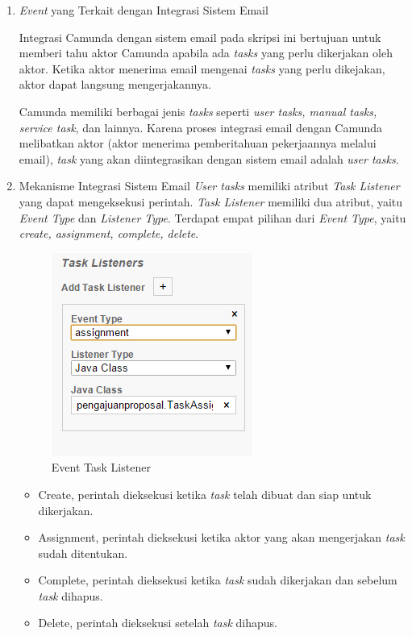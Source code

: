 \begin{enumerate}
\item\textit{Event} yang Terkait dengan Integrasi Sistem Email
\label{sec:eventUserTask}

Integrasi Camunda dengan sistem email pada skripsi ini bertujuan untuk memberi tahu aktor Camunda apabila ada \textit{tasks} yang perlu dikerjakan oleh aktor. Ketika aktor menerima email mengenai \textit{tasks} yang perlu dikejakan, aktor dapat langsung mengerjakannya. 

Camunda memiliki berbagai jenis \textit{tasks} seperti \textit{user tasks, manual tasks, service task}, dan lainnya. Karena proses integrasi email dengan Camunda melibatkan aktor (aktor menerima pemberitahuan pekerjaannya melalui email), \textit{task} yang akan diintegrasikan dengan sistem email adalah \textit{user tasks}.

\item Mekanisme Integrasi Sistem Email
\label{integrasi}
\textit{User tasks} memiliki atribut \textit{Task Listener} yang dapat mengeksekusi perintah. \textit{Task Listener} memiliki dua atribut, yaitu \textit{Event Type} dan \textit{Listener Type}. Terdapat empat pilihan dari \textit{Event Type}, yaitu \textit{create, assignment, complete, delete}. 
		\begin{figure}[H]
			\centering
			\includegraphics[scale=1]{Gambar/Bab-3/TaskListener}
			\caption{Event Task Listener} 
			\label{fig:eventtasklistener}
		\end{figure}
\begin{itemize}
	\item Create, perintah dieksekusi ketika \textit{task} telah dibuat dan siap untuk dikerjakan. 
	\item Assignment, perintah dieksekusi ketika aktor yang akan mengerjakan \textit{task} sudah ditentukan.
	\item Complete, perintah dieksekusi ketika \textit{task} sudah dikerjakan dan sebelum \textit{task} dihapus.
	\item Delete, perintah dieksekusi setelah \textit{task} dihapus.
\end{itemize}



\end{enumerate}

